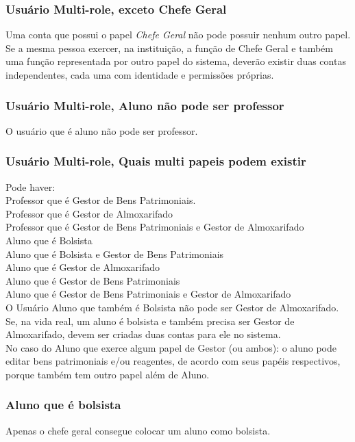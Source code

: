 \documentclass[12pt,a4paper]{article}
\begin{document}
\subsubsection{Usuário Multi-role, exceto Chefe Geral}
\begin{regra}
Uma conta que possui o papel \textit{Chefe Geral} não pode possuir nenhum outro papel. Se a mesma pessoa exercer, na instituição, a função de Chefe Geral e também uma função representada por outro papel do sistema, deverão existir duas contas independentes, cada uma com identidade e permissões próprias. 
\end{regra}
\subsubsection{Usuário Multi-role, Aluno não pode ser professor}
\begin{regra}
O usuário que é aluno não pode ser professor. 
\end{regra}
\subsubsection{Usuário Multi-role, Quais multi papeis podem existir}
\begin{regra}
Pode haver:\\
Professor que é Gestor de Bens Patrimoniais.\\
Professor que é Gestor de Almoxarifado\\
Professor que é Gestor de Bens Patrimoniais e Gestor de Almoxarifado\\
Aluno que é Bolsista\\
Aluno que é Bolsista e Gestor de Bens Patrimoniais\\
Aluno que é Gestor de Almoxarifado\\
Aluno que é Gestor de Bens Patrimoniais\\
Aluno que é Gestor de Bens Patrimoniais e Gestor de Almoxarifado\\
O Usuário Aluno que também é Bolsista não pode ser Gestor de Almoxarifado. Se, na vida real, um aluno é bolsista e também precisa ser Gestor de Almoxarifado, devem ser criadas duas contas para ele no sistema.\\
No caso do Aluno que exerce algum papel de Gestor (ou ambos): o aluno pode editar bens patrimoniais e/ou reagentes, de acordo com seus papéis respectivos, porque também tem outro papel além de Aluno.
\end{regra}
\subsubsection{Aluno que é bolsista}
\begin{regra}
Apenas o chefe geral consegue colocar um aluno como bolsista. 
\end{regra}
\end{document}
